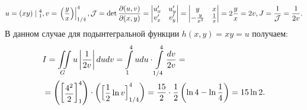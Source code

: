 \begin{examples}
	\begin{equation*}
    u = (xy) \suchthat_1^4, 
		v = \left.\parenthesis{\dfrac{y}{x}}\right|_{1/4}^4, \mathcal{J} = \det\dfrac{\partial(u, v)}
		{\partial(x, y)} =
		\begin{vmatrix}
			u'_x & u'_y\\
			v'_x & v'_y\\
		\end{vmatrix} =
		\begin{vmatrix}
			y & x\\
			-\frac{y}{x^2} & \frac{1}{x}\\
		\end{vmatrix} = 2\dfrac{y}{x} = 2v, J = \dfrac{1}{\mathcal{J}} = \dfrac{1}{2v}.
	\end{equation*}
	В данном случае для подынтегральной функции $ h(x, y) = xy = u $ получаем:    
	\begin{equation*}
		\begin{split}
			& I = \iint\limits_Gu\left\lvert \dfrac{1}{2v} \right\rvert dudv =
			\int\limits_1^4udu \cdot \int\limits_{1/4}^4\dfrac{dv}{2v} =\\
			&=\left( \left[\begin{matrix}\dfrac{4^2}{2}\end{matrix}\right]_1^4 \right)\cdot
			\left( \left[\begin{matrix}\dfrac{1}{2}\ln v\end{matrix}\right]_{1/4}^4 \right) =
			\dfrac{15}{2} \cdot \dfrac{1}{2} \left( \ln 4 - \ln \dfrac{1}{4} \right) = 15 \ln 2.
		\end{split}
	\end{equation*}
\end{examples}